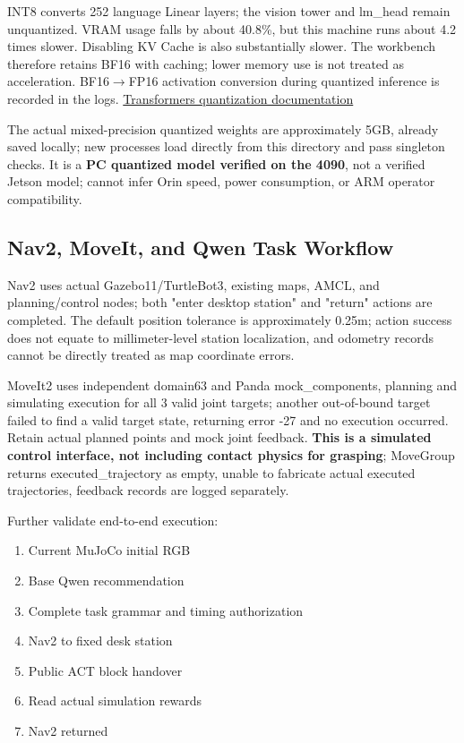 
INT8 converts 252 language Linear layers; the vision tower and lm\_head remain unquantized. VRAM usage falls by about 40.8\%, but this machine runs about 4.2 times slower. Disabling KV Cache is also substantially slower. The workbench therefore retains BF16 with caching; lower memory use is not treated as acceleration. BF16\(\rightarrow\)FP16 activation conversion during quantized inference is recorded in the logs. \href{https://huggingface.co/docs/transformers/v4.57.0/quantization/bitsandbytes}{Transformers quantization documentation}

The actual mixed-precision quantized weights are approximately 5GB, already saved locally; new processes load directly from this directory and pass singleton checks. It is a \textbf{PC quantized model verified on the 4090}, not a verified Jetson model; cannot infer Orin speed, power consumption, or ARM operator compatibility.

\subsection{Nav2, MoveIt, and Qwen Task Workflow}\label{s04-detail-5}

Nav2 uses actual Gazebo11/TurtleBot3, existing maps, AMCL, and planning/control nodes; both "enter desktop station" and "return" actions are completed. The default position tolerance is approximately 0.25m; action success does not equate to millimeter-level station localization, and odometry records cannot be directly treated as map coordinate errors.

MoveIt2 uses independent domain63 and Panda mock\_components, planning and simulating execution for all 3 valid joint targets; another out-of-bound target failed to find a valid target state, returning error -27 and no execution occurred. Retain actual planned points and mock joint feedback. \textbf{This is a simulated control interface, not including contact physics for grasping}; MoveGroup returns executed\_trajectory as empty, unable to fabricate actual executed trajectories, feedback records are logged separately.

Further validate end-to-end execution:

\begin{enumerate}
\def\labelenumi{\arabic{enumi}.}
\tightlist
\item
  Current MuJoCo initial RGB
\item
  Base Qwen recommendation
\item
  Complete task grammar and timing authorization
\item
  Nav2 to fixed desk station
\item
  Public ACT block handover
\item
  Read actual simulation rewards
\item
  Nav2 returned
\end{enumerate}

